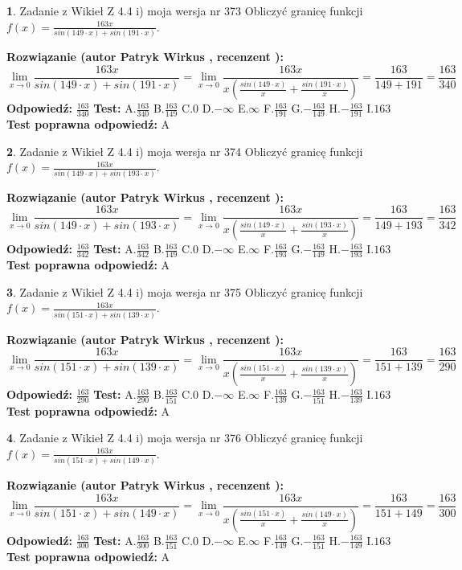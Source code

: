 \documentclass[12pt, a4paper]{article}
\theoremstyle{definition} %
\newtheorem{zad}{}
\newcommand{\zadStart}[1]{\begin{zad}#1\newline}
\newcommand{\zadStop}{\end{zad}}
\newcommand{\rozwStart}[2]{\noindent \textbf{Rozwiązanie (autor #1 , recenzent #2): }\newline}
\newcommand{\rozwStop}{\newline}
\newcommand{\odpStart}{\noindent \textbf{Odpowiedź:}\newline}
\newcommand{\odpStop}{\newline}
\newcommand{\testStart}{\noindent \textbf{Test:}\newline}
\newcommand{\testStop}{\newline}
\newcommand{\kluczStart}{\noindent \textbf{Test poprawna odpowiedź:}\newline}
\newcommand{\kluczStop}{\newline}
\begin{document}
\zadStart{Zadanie z Wikieł Z 4.4 i) moja wersja nr 373}
Obliczyć granicę funkcji $f(x)=\frac{163x}{sin(149\cdot x) +sin(191\cdot x)}$.
\zadStop
\rozwStart{Patryk Wirkus}{}
$$\lim\limits_{x\to 0}\frac{163x}{sin(149\cdot x) +sin(191\cdot x)}=\lim\limits_{x\to 0}\frac{163x}{x(\frac{sin(149\cdot x)}{x}+\frac{sin(191\cdot x)}{x})}=\frac{163}{149+191} = \frac{163}{340}$$
\rozwStop
\odpStart
$\frac{163}{340}$
\odpStop
\testStart
A.$\frac{163}{340}$
B.$\frac{163}{149}$
C.$0$
D.$-\infty$
E.$\infty$
F.$\frac{163}{191}$
G.$-\frac{163}{149}$
H.$-\frac{163}{191}$
I.$163$
\testStop
\kluczStart
A
\kluczStop



\zadStart{Zadanie z Wikieł Z 4.4 i) moja wersja nr 374}
Obliczyć granicę funkcji $f(x)=\frac{163x}{sin(149\cdot x) +sin(193\cdot x)}$.
\zadStop
\rozwStart{Patryk Wirkus}{}
$$\lim\limits_{x\to 0}\frac{163x}{sin(149\cdot x) +sin(193\cdot x)}=\lim\limits_{x\to 0}\frac{163x}{x(\frac{sin(149\cdot x)}{x}+\frac{sin(193\cdot x)}{x})}=\frac{163}{149+193} = \frac{163}{342}$$
\rozwStop
\odpStart
$\frac{163}{342}$
\odpStop
\testStart
A.$\frac{163}{342}$
B.$\frac{163}{149}$
C.$0$
D.$-\infty$
E.$\infty$
F.$\frac{163}{193}$
G.$-\frac{163}{149}$
H.$-\frac{163}{193}$
I.$163$
\testStop
\kluczStart
A
\kluczStop



\zadStart{Zadanie z Wikieł Z 4.4 i) moja wersja nr 375}
Obliczyć granicę funkcji $f(x)=\frac{163x}{sin(151\cdot x) +sin(139\cdot x)}$.
\zadStop
\rozwStart{Patryk Wirkus}{}
$$\lim\limits_{x\to 0}\frac{163x}{sin(151\cdot x) +sin(139\cdot x)}=\lim\limits_{x\to 0}\frac{163x}{x(\frac{sin(151\cdot x)}{x}+\frac{sin(139\cdot x)}{x})}=\frac{163}{151+139} = \frac{163}{290}$$
\rozwStop
\odpStart
$\frac{163}{290}$
\odpStop
\testStart
A.$\frac{163}{290}$
B.$\frac{163}{151}$
C.$0$
D.$-\infty$
E.$\infty$
F.$\frac{163}{139}$
G.$-\frac{163}{151}$
H.$-\frac{163}{139}$
I.$163$
\testStop
\kluczStart
A
\kluczStop



\zadStart{Zadanie z Wikieł Z 4.4 i) moja wersja nr 376}
Obliczyć granicę funkcji $f(x)=\frac{163x}{sin(151\cdot x) +sin(149\cdot x)}$.
\zadStop
\rozwStart{Patryk Wirkus}{}
$$\lim\limits_{x\to 0}\frac{163x}{sin(151\cdot x) +sin(149\cdot x)}=\lim\limits_{x\to 0}\frac{163x}{x(\frac{sin(151\cdot x)}{x}+\frac{sin(149\cdot x)}{x})}=\frac{163}{151+149} = \frac{163}{300}$$
\rozwStop
\odpStart
$\frac{163}{300}$
\odpStop
\testStart
A.$\frac{163}{300}$
B.$\frac{163}{151}$
C.$0$
D.$-\infty$
E.$\infty$
F.$\frac{163}{149}$
G.$-\frac{163}{151}$
H.$-\frac{163}{149}$
I.$163$
\testStop
\kluczStart
A
\kluczStop
\end{document}
